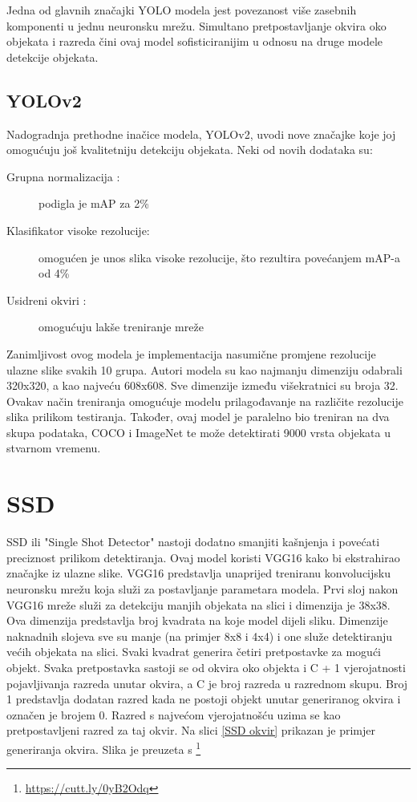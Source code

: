 Jedna od glavnih značajki YOLO modela jest povezanost više zasebnih komponenti u jednu neuronsku mrežu. 
Simultano pretpostavljanje okvira oko objekata i razreda čini ovaj model sofisticiranijim u odnosu na druge modele detekcije objekata. 


\subsection{YOLOv2}
Nadogradnja prethodne inačice modela, YOLOv2, uvodi nove značajke koje joj omogućuju još kvalitetniju detekciju objekata.\newline
Neki od novih dodataka su:
\begin{description}
    \item [Grupna normalizacija :]podigla je mAP za 2\%
    \item [Klasifikator visoke rezolucije:]omogućen je unos slika visoke rezolucije, što rezultira povećanjem mAP-a od 4\%
    \item [Usidreni okviri :]omogućuju lakše treniranje mreže
\end{description}

Zanimljivost ovog modela je implementacija nasumične promjene rezolucije ulazne slike svakih 10 grupa.
Autori modela su kao najmanju dimenziju odabrali 320x320, a 
kao najveću 608x608. Sve dimenzije između višekratnici su broja 32. \newline
Ovakav način treniranja omogućuje modelu prilagođavanje na različite rezolucije 
slika prilikom testiranja. \newline
Također, ovaj model je paralelno bio treniran na dva skupa podataka, COCO i ImageNet te može 
detektirati 9000 vrsta objekata u stvarnom vremenu. \citep{DBLP:journals/corr/RedmonF16}


\section{SSD}
SSD ili "Single Shot Detector" nastoji dodatno smanjiti kašnjenja i povećati preciznost prilikom detektiranja. 
Ovaj model koristi VGG16 kako bi ekstrahirao značajke iz ulazne slike. VGG16 predstavlja unaprijed treniranu konvolucijsku neuronsku mrežu koja služi za postavljanje 
parametara modela. 
Prvi sloj nakon VGG16 mreže služi za detekciju manjih objekata na slici i dimenzija je 38x38. Ova dimenzija predstavlja broj kvadrata na koje model dijeli sliku. 
Dimenzije naknadnih slojeva sve su manje (na primjer 8x8 i 4x4) i one služe detektiranju većih objekata na slici. 
Svaki kvadrat generira četiri pretpostavke za mogući objekt. Svaka pretpostavka sastoji se od okvira oko objekta 
i C + 1 vjerojatnosti pojavljivanja razreda unutar okvira, a C je broj razreda u razrednom skupu. Broj 1 predstavlja dodatan razred
kada ne postoji objekt unutar generiranog okvira i označen je brojem 0. Razred s najvećom vjerojatnošću uzima se kao pretpostavljeni razred 
za taj okvir. Na slici \ref{SSD okvir} prikazan je primjer generiranja okvira. Slika je preuzeta s \footnote{\url{https://cutt.ly/0yB2Odq}}


